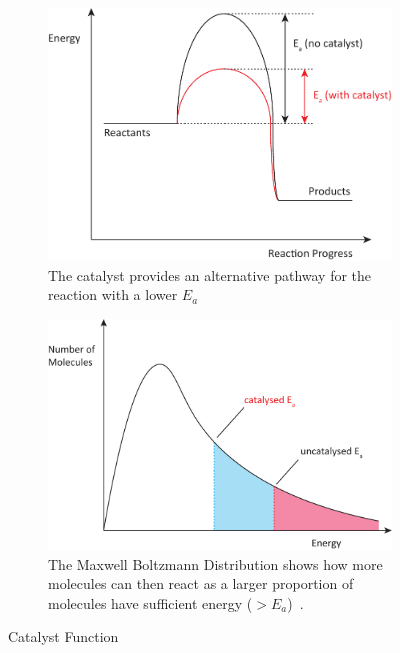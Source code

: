 \begin{figure}[h!]
     \centering
     \begin{subfigure}[t]{0.45\textwidth}
         \centering
         \includegraphics[width=\textwidth]{fig/images/catalyst_enthalpy.pdf}
         \caption{The catalyst provides an alternative pathway for the reaction with a lower $E_a$}
         \label{fig:catalyst-enthalpy}
     \end{subfigure}
        \hfill
     \begin{subfigure}[t]{0.45\textwidth}
         \centering
         \includegraphics[width=\textwidth]{fig/images/catalyst_maxwell.pdf}
         \caption{The Maxwell Boltzmann Distribution shows how more molecules can then react as a larger proportion of molecules have sufficient energy ($>E_a$)~\parencite{Young_Freedman_Young_2020}.}
         \label{fig:catalyst-maxwell}
     \end{subfigure}
    \caption{Catalyst Function}
    \label{fig:background_1}
\end{figure}